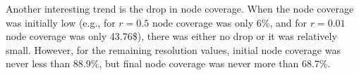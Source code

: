 \documentclass[11pt]{article}   	%
\begin{document}
Another interesting trend is the drop in node coverage.
When the node coverage was initially low (e.g., for $r=0.5$ node coverage was only 6\%, and for $r=0.01$ node coverage was only 43.76\$), there was either no drop or it was relatively small.
However, for the remaining resolution values, initial node coverage was never less than 88.9\%, but final node coverage was
 never more than 68.7\%.
\end{document}
